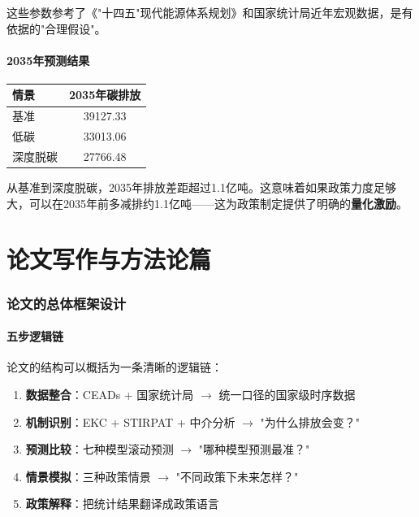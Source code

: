 \documentclass[12pt, a4paper]{article}
\begin{document}
\begin{tipbox}[参数不是拍脑袋定的]
这些参数参考了《"十四五"现代能源体系规划》和国家统计局近年宏观数据，是有依据的"合理假设"。
\end{tipbox}

\subsection{2035年预测结果}

\begin{table}[H]
\centering
\begin{tabular}{lc}
\toprule
\textbf{情景} & \textbf{2035年碳排放} \\
\midrule
基准 & 39127.33 \\
低碳 & 33013.06 \\
深度脱碳 & 27766.48 \\
\bottomrule
\end{tabular}
\end{table}

\begin{tipbox}[怎么读这个结果？]
从基准到深度脱碳，2035年排放差距超过1.1亿吨。这意味着如果政策力度足够大，可以在2035年前多减排约1.1亿吨——这为政策制定提供了明确的\textbf{量化激励}。
\end{tipbox}

\part{论文写作与方法论篇}

\section{论文的总体框架设计}

\subsection{五步逻辑链}

论文的结构可以概括为一条清晰的逻辑链：
\begin{enumerate}[leftmargin=2em]
\item \textbf{数据整合}：CEADs + 国家统计局 $\to$ 统一口径的国家级时序数据
\item \textbf{机制识别}：EKC + STIRPAT + 中介分析 $\to$ "为什么排放会变？"
\item \textbf{预测比较}：七种模型滚动预测 $\to$ "哪种模型预测最准？"
\item \textbf{情景模拟}：三种政策情景 $\to$ "不同政策下未来怎样？"
\item \textbf{政策解释}：把统计结果翻译成政策语言
\end{enumerate}
\end{document}
